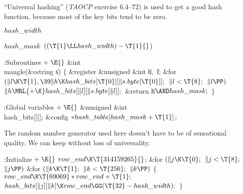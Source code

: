 ``Universal hashing'' ({\sl TAOCP\/} exercise 6.4--72) is
used to get a
good hash function, because most of the key bits tend to be zero.

\Y\B\4\D$\\{hash\_width}$ \5
\par
\B\4\D$\\{hash\_mask}$ \5
$((\T{1}\LL\\{hash\_width})-\T{1}{}$)\par
\Y\B\4:Subroutines\X${}\mathrel+\E{}$\6
\&{int} \\{mangle}(\&{cstring} \|s)\1\1\2\2\6
${}\{{}$\1\6
\&{register} \&{unsigned} \&{int} \|h${},{}$ \|l;\7
\&{for} ${}(\|l\K\T{1},\39\|h\K\\{hash\_bits}[\T{0}][\|s.\\{byte}[\T{0}]];{}$
${}\|l<\T{8};{}$ ${}\|l\PP){}$\1\5
${}\|h\MRL{+{\K}}\\{hash\_bits}[\|l][\|s.\\{byte}[\|l]];{}$\2\6
\&{return} \|h${}\AND\\{hash\_mask};{}$\6
\4${}\}{}$\2\par
\fi

\B{}:Global variables\X${}\mathrel+\E{}$\6
\&{unsigned} \&{int} \\{hash\_bits}[][];\6
\&{config} ${}{*}\\{hash\_table}[\\{hash\_mask}+\T{1}]{}$;\par
\fi

The random number generator used here doesn't have to be
of sensational
quality. We can keep  without loss of
universality.

\Y\B\4:Initialize\X${}\mathrel+\E{}$\6
$\\{row\_end}\K\T{314159265}{}$;\6
\&{for} ${}(\|j\K\T{0};{}$ ${}\|j<\T{8};{}$ ${}\|j\PP){}$\1\6
\&{for} ${}(\|k\K\T{1};{}$ ${}\|k<\T{256};{}$ ${}\|k\PP){}$\5
${}\{{}$\1\6
${}\\{row\_end}\K\T{69069}*\\{row\_end}+\T{1};{}$\6
${}\\{hash\_bits}[\|j][\|k]\K\\{row\_end}\GG(\T{32}-\\{hash\_width});{}$\6
\4${}\}{}$\2\2\par
\fi

